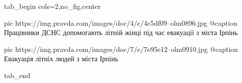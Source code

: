  
 
 
 
 


\ifcmt
  tab_begin cols=2,no_fig,center

     pic https://img.pravda.com/images/doc/4/c/4c5df09--olm0896.jpg
		 @caption Працівники ДСНС допомогають літній жінці під час евакуації з міста Ірпінь

		 pic https://img.pravda.com/images/doc/7/e/7e95e12--olm0910.jpg
		 @caption Евакуація літніх людей з міста Ірпінь

  tab_end
\fi
